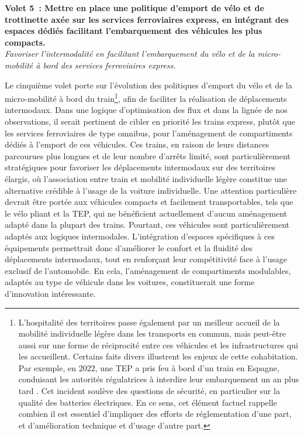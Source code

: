 \begin{refsegment}
    \begin{displayquote}
\textbf{Volet 5~: Mettre en place une politique d’emport de vélo et de trottinette axée sur les services ferroviaires express, en intégrant des espaces dédiés facilitant l’embarquement des véhicules les plus compacts.}
\\
\textsl{Favoriser l’intermodalité en facilitant l’embarquement du vélo et de la micro-mobilité à bord des services ferroviaires express.}
    \end{displayquote}
Le cinquième volet porte sur l’évolution des politiques d’emport du vélo et de la micro-mobilité à bord du train\footnote{
    L'hospitalité des territoires passe également par un meilleur accueil de la mobilité individuelle légère dans les transports en commun, mais peut-être aussi sur une forme de réciprocité entre ces véhicules et les infrastructures qui les accueillent. Certains faits divers illustrent les enjeux de cette cohabitation. Par exemple, en 2022, une \acrfull{TEP} a pris feu à bord d'un train en Espagne, conduisant les autorités régulatrices à interdire leur embarquement un an plus tard \textcolor{blue}{\autocite{cottrel_trottinette_2022}}. Cet incident soulève des questions de sécurité, en particulier sur la qualité des batteries électriques. En ce sens, cet élément factuel rappelle combien il est essentiel d'impliquer des efforts de réglementation d'une part, et d'amélioration technique et d'usage d'autre part.
}, afin de faciliter la réalisation de déplacements intermodaux. Dans une logique d’optimisation des flux et dans la lignée de nos observations, il serait pertinent de cibler en priorité les trains express, plutôt que les services ferroviaires de type omnibus, pour l’aménagement de compartiments dédiés à l’emport de ces véhicules. Ces trains, en raison de leurs distances parcourues plus longues et de leur nombre d’arrêts limité, sont particulièrement stratégiques pour favoriser les déplacements intermodaux sur des territoires élargis, où l’association entre train et mobilité individuelle légère constitue une alternative crédible à l’usage de la voiture individuelle. Une attention particulière devrait être portée aux véhicules compacts et facilement transportables, tels que le vélo pliant et la \acrfull{TEP}, qui ne bénéficient actuellement d’aucun aménagement adapté dans la plupart des trains. Pourtant, ces véhicules sont particulièrement adaptés aux logiques intermodales. L’intégration d’espaces spécifiques à ces équipements permettrait donc d’améliorer le confort et la fluidité des déplacements intermodaux, tout en renforçant leur compétitivité face à l’usage exclusif de l’automobile. En cela, l'aménagement de compartiments modulables, adaptés au type de véhicule dans les voitures, constituerait une forme d'innovation intéressante.%


\end{refsegment}
